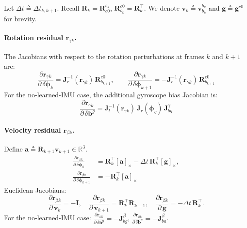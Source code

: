 Let $\Delta t \triangleq \Delta t_{k,k+1}$.
Recall $\mathbf{R}_k=\mathbf{R}_{c0}^{b_k}$, $\mathbf{R}_{b_k}^{c0}=\mathbf{R}_k^\top$.
We denote $\mathbf{v}_k\triangleq \mathbf{v}_{b_k}^{b_k}$ and $\mathbf{g}\triangleq \mathbf{g}^{c0}$ for brevity.

\paragraph{Rotation residual $\mathbf{r}_{\gamma k}$.}
The Jacobians with respect to the rotation perturbations at frames $k$ and $k{+}1$ are:
\begin{equation}
\frac{\partial \mathbf{r}_{\gamma k}}{\partial\,\delta\boldsymbol{\phi}_k}
=
\mathbf{J}_r^{-1}(\mathbf{r}_{\gamma k})\,\mathbf{R}_{b_{k+1}}^{c0},
\qquad
\frac{\partial \mathbf{r}_{\gamma k}}{\partial\,\delta\boldsymbol{\phi}_{k+1}}
=
-\mathbf{J}_r^{-1}(\mathbf{r}_{\gamma k})\,\mathbf{R}_{b_{k+1}}^{c0}
\end{equation}
For the no-learned-IMU case, the additional gyroscope bias Jacobian is:
\begin{equation}
\frac{\partial \mathbf{r}_{\gamma k}}{\partial\,\delta\mathbf{b}^g}
=
\mathbf{J}_l^{-1}(\mathbf{r}_{\gamma k})\,
\mathbf{J}_r(\boldsymbol{\phi}_g)\,\mathbf{J}_{bg}^\gamma
\end{equation}

\paragraph{Velocity residual $\mathbf{r}_{\beta k}$.}
Define $\mathbf{a}\triangleq \mathbf{R}_{k+1}\mathbf{v}_{k+1}\in\mathbb{R}^3$.
\begin{equation}
\begin{aligned}
\frac{\partial \mathbf{r}_{\beta k}}{\partial\,\delta\boldsymbol{\phi}_k}
&=
\mathbf{R}_k^\top[\mathbf{a}]_\times
-
\Delta t\,\mathbf{R}_k^\top[\mathbf{g}]_\times,\\
\frac{\partial \mathbf{r}_{\beta k}}{\partial\,\delta\boldsymbol{\phi}_{k+1}}
&=
-\mathbf{R}_k^\top[\mathbf{a}]_\times
\end{aligned}
\end{equation}
Euclidean Jacobians:
\begin{equation}
\frac{\partial \mathbf{r}_{\beta k}}{\partial\,\mathbf{v}_k}=-\mathbf{I},
\quad
\frac{\partial \mathbf{r}_{\beta k}}{\partial\,\mathbf{v}_{k+1}}=\mathbf{R}_k^\top\mathbf{R}_{k+1},
\quad
\frac{\partial \mathbf{r}_{\beta k}}{\partial\,\mathbf{g}}=-\Delta t\,\mathbf{R}_k^\top.
\end{equation}
For the no-learned-IMU case:
$\frac{\partial \mathbf{r}_{\beta k}}{\partial\,\delta\mathbf{b}^g}=-\mathbf{J}_{bg}^\beta$,
$\frac{\partial \mathbf{r}_{\beta k}}{\partial\,\delta\mathbf{b}^a}=-\mathbf{J}_{ba}^\beta$.

